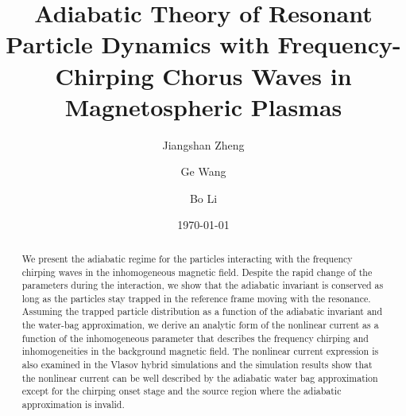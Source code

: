 \documentclass[showkeys,reprint,superscriptaddress]{revtex4-2}
\begin{document}
\title{Adiabatic Theory of Resonant Particle Dynamics with Frequency-Chirping Chorus Waves in Magnetospheric Plasmas}
\author{Jiangshan Zheng}
\author{Ge Wang}
\author{Bo Li}
\date{\today}

\begin{abstract}
 We present the adiabatic regime for the particles interacting with the frequency chirping waves in the inhomogeneous magnetic field. 
 Despite the rapid change of the parameters during the interaction, we show that the adiabatic invariant is conserved as long as the particles stay trapped in the reference frame moving with the resonance.
Assuming the trapped particle distribution as a function of the adiabatic invariant and  the water-bag approximation, we derive an analytic form of the nonlinear current
as a function of 
the inhomogeneous parameter that describes the frequency chirping and inhomogeneities in the background magnetic field.
The nonlinear current expression  is also examined in the  Vlasov hybrid simulations
and the simulation results show that  the nonlinear current can be well described by the adiabatic water bag approximation 
except for the chirping onset stage and the source region where the adiabatic approximation is invalid.
\end{abstract}
\maketitle




\end{document}

